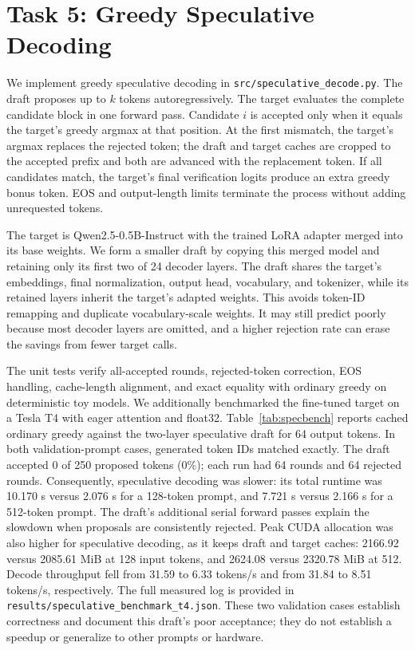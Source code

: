 \documentclass[conference]{IEEEtran}
\begin{document}
\section{Task 5: Greedy Speculative Decoding}
\label{sec:speculative-decoding}
We implement greedy speculative decoding in \texttt{src/speculative\_decode.py}. The draft proposes up to $k$ tokens autoregressively. The target evaluates the complete candidate block in one forward pass. Candidate $i$ is accepted only when it equals the target's greedy argmax at that position. At the first mismatch, the target's argmax replaces the rejected token; the draft and target caches are cropped to the accepted prefix and both are advanced with the replacement token. If all candidates match, the target's final verification logits produce an extra greedy bonus token. EOS and output-length limits terminate the process without adding unrequested tokens.

The target is Qwen2.5-0.5B-Instruct with the trained LoRA adapter merged into its base weights. We form a smaller draft by copying this merged model and retaining only its first two of 24 decoder layers. The draft shares the target's embeddings, final normalization, output head, vocabulary, and tokenizer, while its retained layers inherit the target's adapted weights. This avoids token-ID remapping and duplicate vocabulary-scale weights. It may still predict poorly because most decoder layers are omitted, and a higher rejection rate can erase the savings from fewer target calls.

The unit tests verify all-accepted rounds, rejected-token correction, EOS handling, cache-length alignment, and exact equality with ordinary greedy on deterministic toy models. We additionally benchmarked the fine-tuned target on a Tesla T4 with eager attention and float32. Table~\ref{tab:specbench} reports cached ordinary greedy against the two-layer speculative draft for 64 output tokens. In both validation-prompt cases, generated token IDs matched exactly. The draft accepted 0 of 250 proposed tokens (0\%); each run had 64 rounds and 64 rejected rounds. Consequently, speculative decoding was slower: its total runtime was 10.170 s versus 2.076 s for a 128-token prompt, and 7.721 s versus 2.166 s for a 512-token prompt. The draft's additional serial forward passes explain the slowdown when proposals are consistently rejected. Peak CUDA allocation was also higher for speculative decoding, as it keeps draft and target caches: 2166.92 versus 2085.61 MiB at 128 input tokens, and 2624.08 versus 2320.78 MiB at 512. Decode throughput fell from 31.59 to 6.33 tokens/s and from 31.84 to 8.51 tokens/s, respectively. The full measured log is provided in \texttt{results/speculative\_benchmark\_t4.json}. These two validation cases establish correctness and document this draft's poor acceptance; they do not establish a speedup or generalize to other prompts or hardware.
\end{document}
